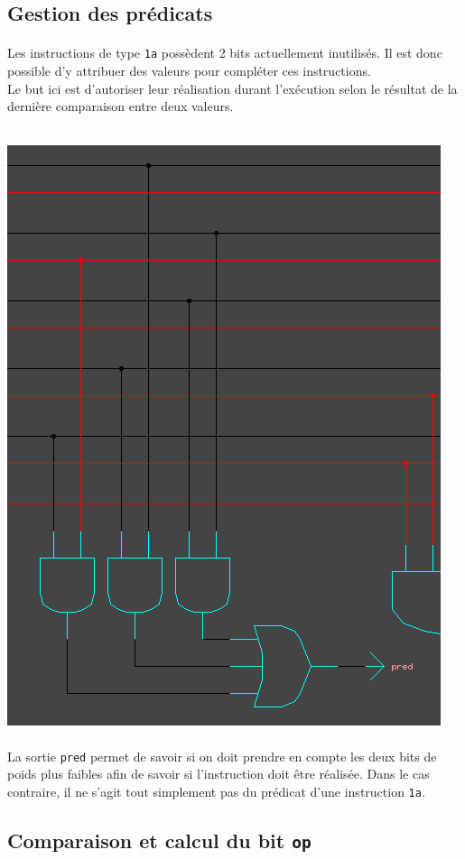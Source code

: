 \documentclass[11pt, a4paper, twoside, titlepage]{article}
\begin{document}
\subsection{Gestion des prédicats}
\paragraph{}
Les instructions de type \texttt{1a} possèdent 2 bits actuellement inutilisés. Il est donc possible d'y attribuer des valeurs pour compléter ces instructions.\\
Le but ici est d'autoriser leur réalisation durant l'exécution selon le résultat de la dernière comparaison entre deux valeurs.\\
\\
\centerline{\includegraphics[width=.5 \textwidth]{log_pred}}
\paragraph{}
La sortie \texttt{pred} permet de savoir si on doit prendre en compte les deux bits de poids plus faibles afin de savoir si l'instruction doit être réalisée. Dans le cas contraire, il ne s'agit tout simplement pas du prédicat d'une instruction \texttt{1a}.

\subsection{Comparaison et calcul du bit \texttt{op}}
\end{document}
